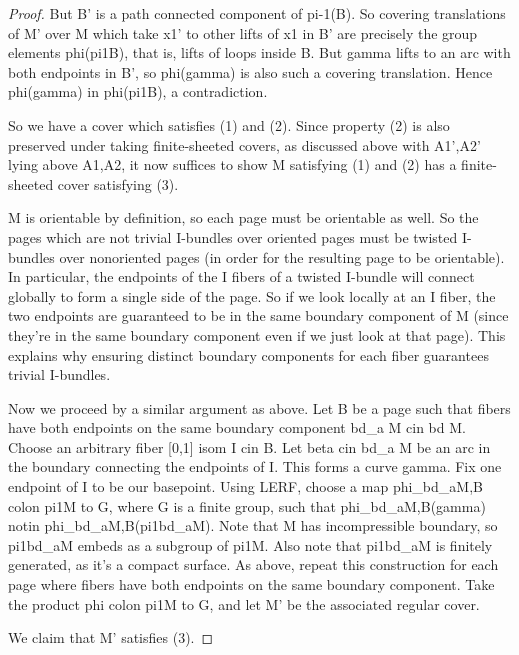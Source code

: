 \documentclass[12pt]{amsart}
\theoremstyle{definition}
\theoremstyle{remark}
\begin{document}
\begin{proof}
But B' is a path connected component of pi-1(B). So covering translations of M'
over M which take x1' to other lifts of x1 in B' are precisely the group
elements phi(pi1B), that is, lifts of loops inside B. But gamma lifts to an arc
with both endpoints in B', so phi(gamma) is also such a covering translation.
Hence phi(gamma) in phi(pi1B), a contradiction.

So we have a cover which satisfies (1) and (2). Since property (2) is also
preserved under taking finite-sheeted covers, as discussed above with A1',A2'
lying above A1,A2, it now suffices to show M satisfying (1) and (2) has
a finite-sheeted cover satisfying (3).

M is orientable by definition, so each page must be orientable as well. So the
pages which are not trivial I-bundles over oriented pages must be twisted
I-bundles over nonoriented pages (in order for the resulting page to be
orientable). In particular, the endpoints of the I fibers of a twisted I-bundle
will connect globally to form a single side of the page. So if we look locally
at an I fiber, the two endpoints are guaranteed to be in the same boundary
component of M (since they're in the same boundary component even if we just
look at that page). This explains why ensuring distinct boundary components for
each fiber guarantees trivial I-bundles.

Now we proceed by a similar argument as above. Let B be a page such that fibers
have both endpoints on the same boundary component bd_a M cin bd M. Choose an
arbitrary fiber [0,1] isom I cin B. Let beta cin bd_a M be an arc in the
boundary connecting the endpoints of I. This forms a curve gamma. Fix one
endpoint of I to be our basepoint. Using LERF, choose a map phi_{bd_aM,B} colon
pi1M to G, where G is a finite group, such that phi_{bd_aM,B}(gamma) notin
phi_{bd_aM,B}(pi1bd_aM). Note that M has incompressible boundary, so pi1bd_aM
embeds as a subgroup of pi1M. Also note that pi1bd_aM is finitely generated, as
it's a compact surface. As above, repeat this construction for each page where
fibers have both endpoints on the same boundary component. Take the product phi
colon pi1M to G, and let M' be the associated regular cover.

We claim that M' satisfies (3).

\end{proof}
\end{document}
